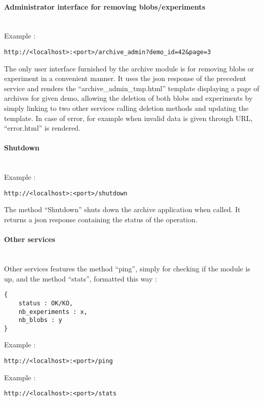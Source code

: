 \paragraph{Administrator interface for removing blobs/experiments} \hspace{0pt} \\
Example :
\begin{verbatim}
http://<localhost>:<port>/archive_admin?demo_id=42&page=3
\end{verbatim}
The only user interface furnished by the archive module is for removing blobs or experiment in a convenient manner. It uses the json response of the precedent service and renders the ``archive\_admin\_tmp.html'' template displaying a page of archives for given demo, allowing the deletion of both blobs and experiments by simply linking to two other services calling deletion methods and updating the template. In case of error, for example when invalid data is given through URL, ``error.html'' is rendered.

\paragraph{Shutdown} \hspace{0pt} \\
Example :
\begin{verbatim}
http://<localhost>:<port>/shutdown
\end{verbatim}
The method ``Shutdown'' shuts down the archive application when called. It returns a json response containing the status of the operation.

\paragraph{Other services} \hspace{0pt} \\
Other services features the method ``ping'', simply for checking if the module is up, and the method ``stats'', formatted this way :
\begin{verbatim}
{
    status : OK/KO,
    nb_experiments : x,
    nb_blobs : y
}
\end{verbatim}
Example :
\begin{verbatim}
http://<localhost>:<port>/ping
\end{verbatim}
Example :
\begin{verbatim}
http://<localhost>:<port>/stats
\end{verbatim}
